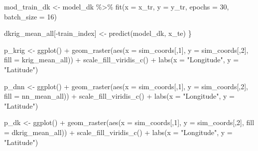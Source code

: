 \documentclass[
]{article}
\newenvironment{Shaded}{\begin{snugshade}}{\end{snugshade}}
\newcommand{\AttributeTok}[1]{\textcolor[rgb]{0.77,0.63,0.00}{#1}}
\newcommand{\DecValTok}[1]{\textcolor[rgb]{0.00,0.00,0.81}{#1}}
\newcommand{\FunctionTok}[1]{\textcolor[rgb]{0.00,0.00,0.00}{#1}}
\newcommand{\NormalTok}[1]{#1}
\newcommand{\OtherTok}[1]{\textcolor[rgb]{0.56,0.35,0.01}{#1}}
\newcommand{\SpecialCharTok}[1]{\textcolor[rgb]{0.00,0.00,0.00}{#1}}
\newcommand{\StringTok}[1]{\textcolor[rgb]{0.31,0.60,0.02}{#1}}
\begin{document}
\begin{Shaded}
\begin{Highlighting}[]
\NormalTok{mod\_train\_dk }\OtherTok{\textless{}{-}}\NormalTok{ model\_dk }\SpecialCharTok{\%\textgreater{}\%}
  \FunctionTok{fit}\NormalTok{(}\AttributeTok{x =}\NormalTok{ x\_tr, }\AttributeTok{y =}\NormalTok{ y\_tr, }\AttributeTok{epochs =} \DecValTok{30}\NormalTok{, }\AttributeTok{batch\_size =} \DecValTok{16}\NormalTok{)}
  
\NormalTok{  dkrig\_mean\_all[}\SpecialCharTok{{-}}\NormalTok{train\_index] }\OtherTok{\textless{}{-}} \FunctionTok{predict}\NormalTok{(model\_dk, x\_te)}
\NormalTok{\}}
\end{Highlighting}
\end{Shaded}

\begin{Shaded}
\begin{Highlighting}[]
\NormalTok{p\_krig }\OtherTok{\textless{}{-}}
  \FunctionTok{ggplot}\NormalTok{() }\SpecialCharTok{+}
  \FunctionTok{geom\_raster}\NormalTok{(}\FunctionTok{aes}\NormalTok{(}\AttributeTok{x =}\NormalTok{ sim\_coords[,}\DecValTok{1}\NormalTok{], }\AttributeTok{y =}\NormalTok{ sim\_coords[,}\DecValTok{2}\NormalTok{], }\AttributeTok{fill =}\NormalTok{ krig\_mean\_all)) }\SpecialCharTok{+}
  \FunctionTok{scale\_fill\_viridis\_c}\NormalTok{() }\SpecialCharTok{+} 
  \FunctionTok{labs}\NormalTok{(}\AttributeTok{x =} \StringTok{"Longitude"}\NormalTok{,  }\AttributeTok{y =} \StringTok{"Latitude"}\NormalTok{)}
  
\NormalTok{p\_dnn }\OtherTok{\textless{}{-}} 
  \FunctionTok{ggplot}\NormalTok{() }\SpecialCharTok{+}
  \FunctionTok{geom\_raster}\NormalTok{(}\FunctionTok{aes}\NormalTok{(}\AttributeTok{x =}\NormalTok{ sim\_coords[,}\DecValTok{1}\NormalTok{], }\AttributeTok{y =}\NormalTok{ sim\_coords[,}\DecValTok{2}\NormalTok{], }\AttributeTok{fill =}\NormalTok{ nn\_mean\_all)) }\SpecialCharTok{+}
  \FunctionTok{scale\_fill\_viridis\_c}\NormalTok{() }\SpecialCharTok{+} 
  \FunctionTok{labs}\NormalTok{(}\AttributeTok{x =} \StringTok{"Longitude"}\NormalTok{,  }\AttributeTok{y =} \StringTok{"Latitude"}\NormalTok{)}
  
\NormalTok{p\_dk }\OtherTok{\textless{}{-}} 
  \FunctionTok{ggplot}\NormalTok{() }\SpecialCharTok{+}
  \FunctionTok{geom\_raster}\NormalTok{(}\FunctionTok{aes}\NormalTok{(}\AttributeTok{x =}\NormalTok{ sim\_coords[,}\DecValTok{1}\NormalTok{], }\AttributeTok{y =}\NormalTok{ sim\_coords[,}\DecValTok{2}\NormalTok{], }\AttributeTok{fill =}\NormalTok{ dkrig\_mean\_all)) }\SpecialCharTok{+}
  \FunctionTok{scale\_fill\_viridis\_c}\NormalTok{() }\SpecialCharTok{+} 
  \FunctionTok{labs}\NormalTok{(}\AttributeTok{x =} \StringTok{"Longitude"}\NormalTok{,  }\AttributeTok{y =} \StringTok{"Latitude"}\NormalTok{)}
\end{Highlighting}
\end{Shaded}
\end{document}
